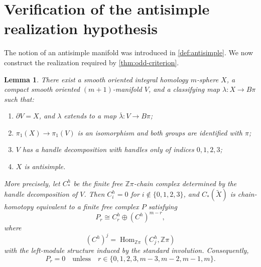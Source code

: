 \documentclass[10pt,reqno]{amsart}
\numberwithin{equation}{section}
\newtheorem{lemma}{Lemma}
\theoremstyle{definition}
\theoremstyle{remark}
\newcommand{\Z}{\mathbb Z}
\begin{document}
\section{Verification of the antisimple realization hypothesis}
\label{sec:odd-antisimple-verification}

The notion of an antisimple manifold was introduced in
\cref{def:antisimple}.  We now construct the realization required by
\cref{thm:odd-criterion}.



\begin{lemma}\label{lem:odd-kervaire-antisimple}
There exist a smooth oriented integral homology \(m\)-sphere \(X\), a
compact smooth oriented \((m+1)\)-manifold \(V\), and a classifying map
\(\lambda:X\to B\pi\) such that:
\begin{enumerate}[label=\textup{(\roman*)}]
\item \(\partial V=X\), and \(\lambda\) extends to a map
      \(\overline\lambda:V\to B\pi\);
\item \(\pi_1(X)\to\pi_1(V)\) is an isomorphism and both groups are
      identified with \(\pi\);
\item \(V\) has a handle decomposition with handles only of indices
      \(0,1,2,3\);
\item \(X\) is antisimple.
\end{enumerate}
More precisely, let \(C^h_*\) be the finite free
\(\Z\pi\)-chain complex determined by the handle decomposition of
\(V\).  Then \(C^h_i=0\) for
\(i\notin\{0,1,2,3\}\), and \(C_*(\widetilde X)\) is
chain-homotopy equivalent to a finite free complex \(P\) satisfying
\begin{equation}\label{eq:antisimple-explicit-modules}
P_r\cong C^h_r\oplus (C^h)^{m-r},
\end{equation}
where
\[
(C^h)^j=\operatorname{Hom}_{\Z\pi}(C^h_j,\Z\pi)
\]
with the left-module structure induced by the standard involution.
Consequently,
\begin{equation}\label{eq:antisimple-support}
P_r=0
\quad\text{unless}\quad
r\in\{0,1,2,3,m-3,m-2,m-1,m\}.
\end{equation}
\end{lemma}
\end{document}
